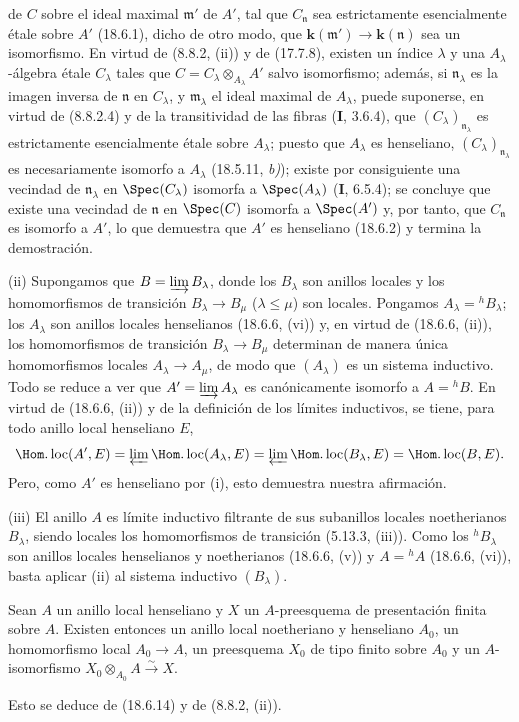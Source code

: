 de $C$ sobre el ideal maximal $\mathfrak m'$ de $A'$, tal que $C_{\mathfrak n}$ sea estrictamente esencialmente étale sobre $A'$ (18.6.1), dicho de otro modo, que $\boldsymbol{k}(\mathfrak m')\to \boldsymbol{k}(\mathfrak n)$ sea un isomorfismo. En virtud de (8.8.2, (ii)) y de (17.7.8), existen un índice $\lambda$ y una $A_\lambda$-álgebra étale $C_\lambda$ tales que $C=C_\lambda\otimes_{A_\lambda}A'$ salvo isomorfismo; además, si $\mathfrak n_\lambda$ es la imagen inversa de $\mathfrak n$ en $C_\lambda$, y $\mathfrak m_\lambda$ el ideal maximal de $A_\lambda$, puede suponerse, en virtud de (8.8.2.4) y de la transitividad de las fibras (\textbf I, 3.6.4), que $(C_\lambda)_{\mathfrak n_\lambda}$ es estrictamente esencialmente étale sobre $A_\lambda$; puesto que $A_\lambda$ es henseliano, $(C_\lambda)_{\mathfrak n_\lambda}$ es necesariamente isomorfo a $A_\lambda$ (18.5.11, \emph{b)}); existe por consiguiente una vecindad de $\mathfrak n_\lambda$ en $\Spec(C_\lambda)$ isomorfa a $\Spec(A_\lambda)$ (\textbf I, 6.5.4); se concluye que existe una vecindad de $\mathfrak n$ en $\Spec(C)$ isomorfa a $\Spec(A')$ y, por tanto, que $C_{\mathfrak n}$ es isomorfo a $A'$, lo que demuestra que $A'$ es henseliano (18.6.2) y termina la demostración.

(ii) Supongamos que $B=\varinjlim B_\lambda$, donde los $B_\lambda$ son anillos locales y los homomorfismos de transición $B_\lambda\to B_\mu$ ($\lambda\leq\mu$) son locales. Pongamos $A_\lambda={}^h\!B_\lambda$; los $A_\lambda$ son anillos locales henselianos (18.6.6, (vi)) y, en virtud de (18.6.6, (ii)), los homomorfismos de transición $B_\lambda\to B_\mu$ determinan de manera única homomorfismos locales $A_\lambda\to A_\mu$, de modo que $(A_\lambda)$ es un sistema inductivo. Todo se reduce a ver que $A'=\varinjlim A_\lambda$ es canónicamente isomorfo a $A={}^h\!B$. En virtud de (18.6.6, (ii)) y de la definición de los límites inductivos, se tiene, para todo anillo local henseliano $E$,
\[
  \Hom.\operatorname{loc}(A',E)
  =\varprojlim\Hom.\operatorname{loc}(A_\lambda,E)
  =\varprojlim\Hom.\operatorname{loc}(B_\lambda,E)
  =\Hom.\operatorname{loc}(B,E).
\]
Pero, como $A'$ es henseliano por (i), esto demuestra nuestra afirmación.

(iii) El anillo $A$ es límite inductivo filtrante de sus subanillos locales noetherianos $B_\lambda$, siendo locales los homomorfismos de transición (5.13.3, (iii)). Como los ${}^h\!B_\lambda$ son anillos locales henselianos y noetherianos (18.6.6, (v)) y $A={}^h\!A$ (18.6.6, (vi)), basta aplicar (ii) al sistema inductivo $(B_\lambda)$.

\begin{corollary}[18.6.15]
\label{IV.18.6.15}
Sean $A$ un anillo local henseliano y $X$ un $A$-preesquema de presentación finita sobre $A$. Existen entonces un anillo local noetheriano y henseliano $A_0$, un homomorfismo local $A_0\to A$, un preesquema $X_0$ de tipo finito sobre $A_0$ y un $A$-isomorfismo $X_0\otimes_{A_0}A\xrightarrow{\sim}X$.
\end{corollary}

Esto se deduce de (18.6.14) y de (8.8.2, (ii)).
